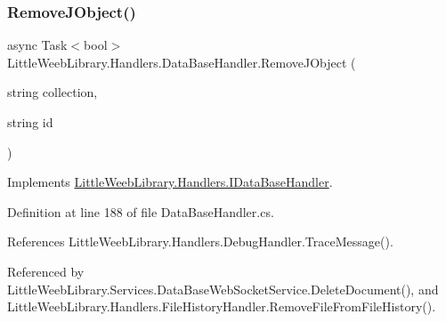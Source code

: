 \subsubsection{\texorpdfstring{Remove\+J\+Object()}{RemoveJObject()}\hspace{0.1cm}{\footnotesize\ttfamily [1/2]}}
{\footnotesize\ttfamily async Task$<$bool$>$ Little\+Weeb\+Library.\+Handlers.\+Data\+Base\+Handler.\+Remove\+J\+Object (\begin{DoxyParamCaption}\item[{string}]{collection,  }\item[{string}]{id }\end{DoxyParamCaption})}



Implements \mbox{\hyperlink{interface_little_weeb_library_1_1_handlers_1_1_i_data_base_handler_a4d78b21102490d85906d0eb3f4693227}{Little\+Weeb\+Library.\+Handlers.\+I\+Data\+Base\+Handler}}.



Definition at line 188 of file Data\+Base\+Handler.\+cs.



References Little\+Weeb\+Library.\+Handlers.\+Debug\+Handler.\+Trace\+Message().



Referenced by Little\+Weeb\+Library.\+Services.\+Data\+Base\+Web\+Socket\+Service.\+Delete\+Document(), and Little\+Weeb\+Library.\+Handlers.\+File\+History\+Handler.\+Remove\+File\+From\+File\+History().


